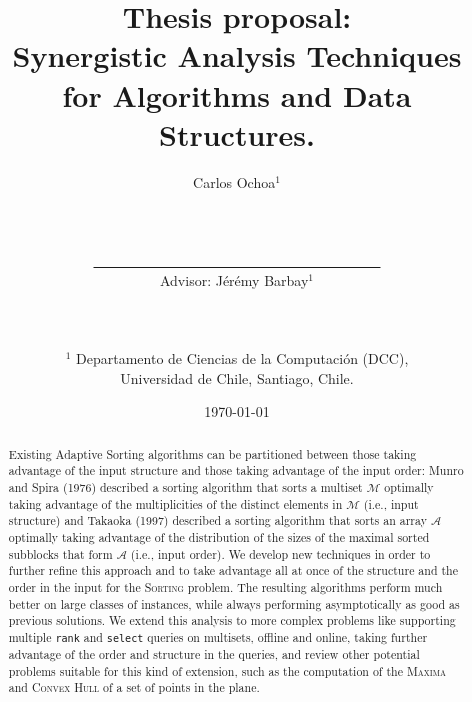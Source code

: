 \documentclass[10pt]{article}
\title{Thesis proposal: \\Synergistic Analysis Techniques\\ for Algorithms and Data Structures.}
\author{Carlos Ochoa$^{1}$
  \\\\\\\\\underline{\ \ \ \ \ \ \ \ \ \ \ \ \ \ \ \ \ \ \ \ \ \ \ \ \
    \ \ \ \ \ \ \ \ \ \ \ \ \ \ \ \ }
  \\Advisor: J\'er\'emy Barbay$^1$\\\\\\\\
  $^1$ Departamento de Ciencias de la Computaci\'on (DCC),\\ Universidad de Chile, Santiago, Chile.
}
\date{\today}
\begin{document}
\maketitle
\begin{abstract}
  Existing Adaptive Sorting algorithms can be partitioned between
  those taking advantage of the input structure and those taking
  advantage of the input order: Munro and Spira (1976) described a
  sorting algorithm that sorts a multiset $\mathcal{M}$ optimally
  taking advantage of the multiplicities of the distinct elements in
  $\mathcal{M}$ (i.e., input structure) and Takaoka (1997) described a
  sorting algorithm that sorts an array $\mathcal{A}$ optimally taking
  advantage of the distribution of the sizes of the maximal sorted
  subblocks that form $\mathcal{A}$ (i.e., input order). We develop
  new techniques in order to further refine this approach and to take
  advantage all at once of the structure and the order in the input
  for the \textsc{Sorting} problem. The resulting algorithms perform
  much better on large classes of instances, while always performing
  asymptotically as good as previous solutions. We extend this
  analysis to more complex problems like supporting multiple
  \texttt{rank} and \texttt{select} queries on multisets, offline and
  online, taking further advantage of the order and structure in the
  queries, and review other potential problems suitable for this kind
  of extension, such as the computation of the \textsc{Maxima} and
  \textsc{Convex Hull} of a set of points in the plane.
\end{abstract}
\clearpage





\end{document}
